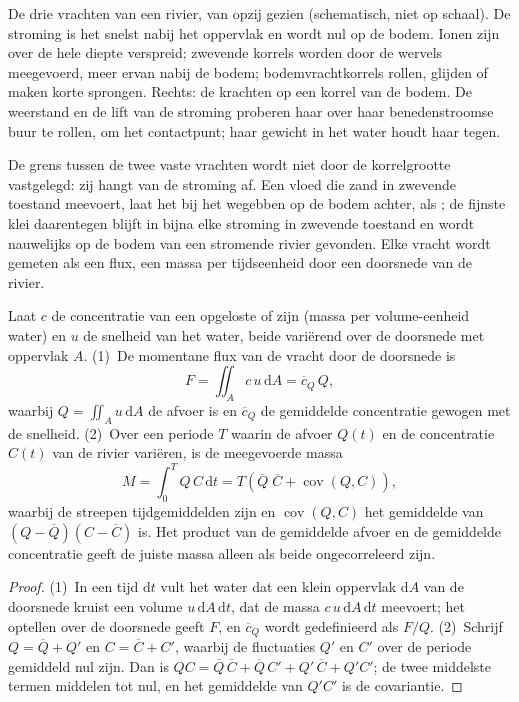 \begin{omfigure}
{\small De drie vrachten van een rivier, van opzij gezien (schematisch, niet op schaal). De stroming is het snelst nabij het oppervlak en wordt nul op de bodem. Ionen zijn over de hele diepte verspreid; zwevende korrels worden door de wervels meegevoerd, meer ervan nabij de bodem; bodemvrachtkorrels rollen, glijden of maken korte sprongen. Rechts: de krachten op een korrel van de bodem. De weerstand en de lift van de stroming proberen haar over haar benedenstroomse buur te rollen, om het contactpunt; haar gewicht in het water houdt haar tegen.}
\label{fig:b1:erosion-transport:loads}
\end{omfigure}

De grens tussen de twee vaste vrachten wordt niet door de korrelgrootte vastgelegd: zij hangt van de stroming af. Een vloed die zand in zwevende toestand meevoert, laat het bij het wegebben op de bodem achter, als ; de fijnste klei daarentegen blijft in bijna elke stroming in zwevende toestand en wordt nauwelijks op de bodem van een stromende rivier gevonden. Elke vracht wordt gemeten als een flux, een massa per tijdseenheid door een doorsnede van de rivier.

\begin{proposition}\label{prop:b1:erosion-transport:flux}
Laat $c$ de concentratie van een opgeloste of  zijn (massa per volume-eenheid water) en $u$ de snelheid van het water, beide variërend over de doorsnede met oppervlak $A$. (1)~De momentane flux van de vracht door de doorsnede is
\[
  F = \iint_A c\,u\,\mathrm dA = \overline{c}_Q\,Q,
\]
waarbij $Q = \iint_A u\,\mathrm dA$ de afvoer is en $\overline{c}_Q$ de gemiddelde concentratie gewogen met de snelheid. (2)~Over een periode $T$ waarin de afvoer $Q(t)$ en de concentratie $C(t)$ van de rivier variëren, is de meegevoerde massa
\[
  M = \int_0^T Q\,C\,\mathrm dt = T\left(\overline{Q}\;\overline{C} +
  \operatorname{cov}(Q, C)\right),
\]
waarbij de streepen tijdgemiddelden zijn en $\operatorname{cov}(Q, C)$ het gemiddelde van $(Q - \overline{Q})(C - \overline{C})$ is. Het product van de gemiddelde afvoer en de gemiddelde concentratie geeft de juiste massa alleen als beide ongecorreleerd zijn.
\end{proposition}

\begin{proof}
(1)~In een tijd $\mathrm dt$ vult het water dat een klein oppervlak $\mathrm dA$ van de doorsnede kruist een volume $u\,\mathrm dA\,\mathrm dt$, dat de massa $c\,u\,\mathrm dA\,\mathrm dt$ meevoert; het optellen over de doorsnede geeft $F$, en $\overline{c}_Q$ wordt gedefinieerd als $F/Q$. (2)~Schrijf $Q = \overline{Q} + Q'$ en $C =
\overline{C} + C'$, waarbij de fluctuaties $Q'$ en $C'$ over de periode gemiddeld nul zijn. Dan is $QC = \overline{Q}\,\overline{C} + \overline{Q}\,C' + Q'\,\overline{C}
+ Q'C'$; de twee middelste termen middelen tot nul, en het gemiddelde van $Q'C'$ is de covariantie.
\end{proof}


